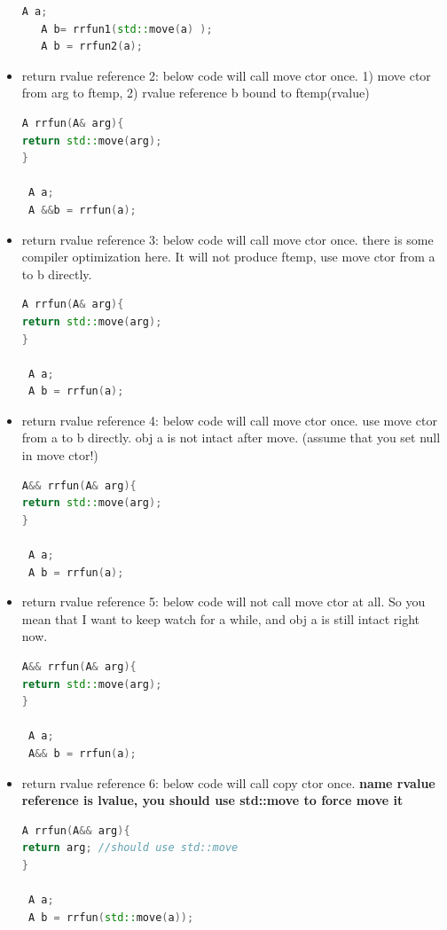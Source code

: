 \documentclass[a4paper,12pt,twoside]{book}
\begin{document}
\begin{itemize}
\begin{lstlisting}[frame=single, language=c++]
   A a;
   A b= rrfun1(std::move(a) );
   A b = rrfun2(a);
\end{lstlisting}


\item return rvalue reference 2:   below code will call move ctor once.  1) move ctor from arg to ftemp, 2) rvalue reference b bound to ftemp(rvalue)
\begin{lstlisting}[frame=single, language=c++]
A rrfun(A& arg){
return std::move(arg);
}

 A a;
 A &&b = rrfun(a);
\end{lstlisting}

\item return rvalue reference 3:   below code will call move ctor once.  there is some compiler optimization here. It will not produce ftemp, use move ctor from a to b directly.
\begin{lstlisting}[frame=single, language=c++]
A rrfun(A& arg){
return std::move(arg);
}

 A a;
 A b = rrfun(a);
\end{lstlisting}

\item return rvalue reference 4:   below code will call move ctor once.  use move ctor from a to b directly.  obj a is not intact after move. (assume that you set null in move ctor!)
\begin{lstlisting}[frame=single, language=c++]
A&& rrfun(A& arg){
return std::move(arg);
}

 A a;
 A b = rrfun(a);
\end{lstlisting}

\item return rvalue reference 5:   below code will not call move ctor at all. So you mean that I want to keep watch for a while, and obj a is still intact right now.
\begin{lstlisting}[frame=single, language=c++]
A&& rrfun(A& arg){
return std::move(arg);
}

 A a;
 A&& b = rrfun(a);
\end{lstlisting}

\item return rvalue reference 6:   below code will call copy ctor once. \textbf{name rvalue reference is lvalue, you should use std::move to force move it}
\begin{lstlisting}[frame=single, language=c++]
A rrfun(A&& arg){
return arg; //should use std::move
}

 A a;
 A b = rrfun(std::move(a));
\end{lstlisting}


\end{itemize}
\end{document}
